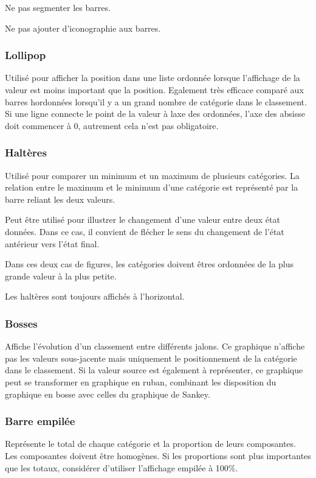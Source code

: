 \documentclass[a4paper,12pt]{article}
\begin{document}
\begin{multicols}{2}
Ne pas segmenter les barres. \autocite{jonathanschwabishComparingCategories2021}

Ne pas ajouter d'iconographie aux barres. \autocite{tranDiscoveringAccessibleData2024}
\subsubsection*{Lollipop}
\label{sec:org4c20e9c}
Utilisé pour afficher la position dans une liste ordonnée lorsque l'affichage de la valeur est moins important que la position. \autocite{alansmithLexiqueVisuel} Egalement très efficace comparé aux barres hordonnées lorsqu'il y a un grand nombre de catégorie dans le classement. \autocite{mikeyiHowChooseRight2020}  Si une ligne connecte le point de la valeur à laxe des ordonnées, l'axe des absisse doit commencer à 0, autrement cela n'est pas obligatoire.
\subsubsection*{Haltères}
\label{sec:orgc25fa86}
Utilisé pour comparer un minimum et un maximum de plusieurs catégories. \autocite{alansmithLexiqueVisuel} La relation entre le maximum et le minimum d'une catégorie est représenté par la barre reliant les deux valeurs. \autocite{mikeyiHowChooseRight2020}

Peut être utilisé pour illustrer le changement d'une valeur entre deux état données. Dans ce cas, il convient de flécher le sens du changement de l'état antérieur vers l'état final.

Dans ces deux cas de figures, les catégories doivent êtres ordonnées de la plus grande valeur à la plus petite.

Les haltères sont toujours affichés à l'horizontal.
\subsubsection*{Bosses}
\label{sec:org53c9142}
Affiche l'évolution d'un classement entre différents jalons. \autocite{mikeyiHowChooseRight2020,alansmithLexiqueVisuel}  Ce graphique n'affiche pas les valeurs sous-jacente mais uniquement le positionnement de la catégorie dans le classement. \autocite{jonathanschwabishTime2021} Si la valeur source est également à représenter, ce graphique peut se transformer en graphique en ruban, combinant les disposition du graphique en bosse avec celles du graphique de Sankey. \autocite{jonathanschwabishTime2021}
\subsubsection*{Barre empilée}
\label{sec:org3fa9cfa}
Représente le total de chaque catégorie et la proportion de leurs composantes. Les composantes doivent être homogènes. Si les proportions sont plus importantes que les totaux, considérer d'utiliser l'affichage empilée à 100\%. \autocite{mikeyiHowChooseRight2020}


\end{multicols}
\end{document}

